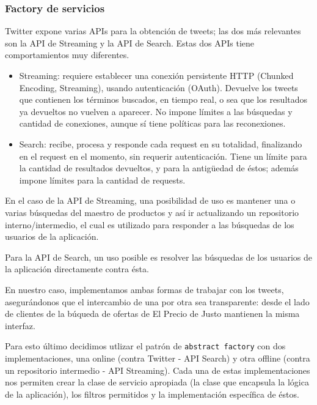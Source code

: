 \subsubsection{Factory de servicios}
Twitter expone varias APIs para la obtenci\'on de tweets; las dos m\'as relevantes son la API de Streaming y la API de Search. Estas dos APIs tiene comportamientos muy diferentes.

\begin{itemize}
\item Streaming: requiere establecer una conexi\'on persistente HTTP (Chunked Encoding, Streaming), usando autenticaci\'on (OAuth). Devuelve los tweets que contienen los t\'erminos buscados, en tiempo real, o sea que los resultados ya devueltos no vuelven a aparecer. No impone l\'imites a las b\'usquedas y cantidad de conexiones, aunque s\'i tiene pol\'iticas para las reconexiones.
\item Search: recibe, procesa y responde cada request en su totalidad, finalizando en el request en el momento, sin requerir autenticaci\'on. Tiene un l\'imite para la cantidad de resultados devueltos, y para la antig\"uedad de \'estos; adem\'as impone l\'imites para la cantidad de requests.
\end{itemize}

En el caso de la API de Streaming, una posibilidad de uso es mantener una o varias b\'usquedas del maestro de productos y as\'i ir actualizando un repositorio interno/intermedio, el cual es utilizado para responder a las b\'usquedas de los usuarios de la aplicaci\'on.

Para la API de Search, un uso posible es resolver las b\'usquedas de los usuarios de la aplicaci\'on directamente contra \'esta.

En nuestro caso, implementamos ambas formas de trabajar con los tweets, asegur\'andonos que el intercambio de una por otra sea transparente: desde el lado de clientes de la b\'uqueda de ofertas de El Precio de Justo mantienen la misma interfaz.

Para esto \'ultimo decidimos utlizar el patr\'on de \texttt{abstract factory} con dos
implementaciones, una online (contra Twitter - API Search) y otra offline (contra un repositorio intermedio - API Streaming). Cada una de estas implementaciones nos permiten crear la clase de servicio apropiada (la clase que encapsula la l\'ogica de la aplicaci\'on), los filtros permitidos y la implementaci\'on espec\'ifica de \'estos.


